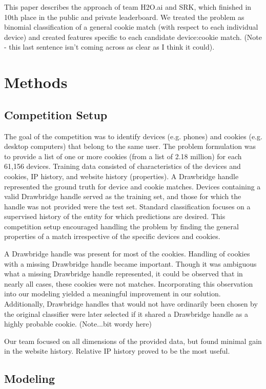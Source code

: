 \documentclass[9pt, journal]{IEEEtran}
\begin{document}
This paper describes the approach of team H2O.ai and SRK, which finished in 10th place in the public and private leaderboard.
We treated the problem as binomial classification of a general cookie match (with respect to each individual device) and created features specific to each candidate device:cookie match. (Note - this last sentence isn't coming across as clear as I think it could).

\section{Methods}
\subsection{Competition Setup}
The goal of the competition was to identify devices (e.g. phones) and cookies (e.g. desktop computers) that belong to the same user.
The problem formulation was to provide a list of one or more cookies (from a list of 2.18 million) for each 61,156 devices.
Training data consisted of characteristics of the devices and cookies, IP history, and website history (properties). 
A Drawbridge handle represented the ground truth for device and cookie matches. 
Devices containing a valid Drawbridge handle served as the training set, and those for which the handle was not provided were the test set. 
Standard classification focuses on a supervised history of the entity for which predictions are desired. This competition setup encouraged handling the problem by finding the general properties of a match irrespective of the specific devices and cookies.

A Drawbridge handle was present for most of the cookies. Handling of cookies with a missing Drawbridge handle became important. Though it was ambiguous what a missing Drawbridge handle represented, it could be observed that in nearly all cases, these cookies were not matches. 
Incorporating this observation into our modeling yielded a meaningful improvement in our solution. Additionally, Drawbridge handles that would not have ordinarily been chosen by the original classifier were later selected if it shared a Drawbridge handle as a highly probable cookie. (Note...bit wordy here)

Our team focused on all dimensions of the provided data, but found minimal gain in the website history. Relative IP history proved to be the most useful.

\subsection{Modeling}
\end{document}
